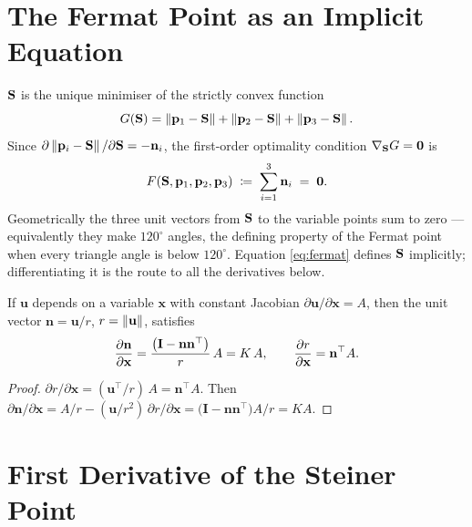 \documentclass[11pt,a4paper]{article}
\begin{document}
\section{The Fermat Point as an Implicit Equation}
\label{sec:implicit}

$\mathbf{S}$ is the unique minimiser of the strictly convex function
\begin{equation}
  G(\mathbf{S}) = \left\|\mathbf{p}_{1}-\mathbf{S}\right\| + \left\|\mathbf{p}_{2}-\mathbf{S}\right\| + \left\|\mathbf{p}_{3}-\mathbf{S}\right\|.
\end{equation}
Since $\partial\left\|\mathbf{p}_{i}-\mathbf{S}\right\|/\partial\mathbf{S} = -\mathbf{n}_i$, the first-order
optimality condition $\nabla_{\mathbf{S}} G = \mathbf{0}$ is
\begin{equation}
  F(\mathbf{S},\mathbf{p}_{1},\mathbf{p}_{2},\mathbf{p}_{3}) \;\coloneqq\; \sum_{i=1}^{3}\mathbf{n}_i
  \;=\; \mathbf{0}.
  \label{eq:fermat}
\end{equation}
Geometrically the three unit vectors from $\mathbf{S}$ to the variable points sum to
zero --- equivalently they make $120^\circ$ angles, the defining property of
the Fermat point when every triangle angle is below $120^\circ$.  Equation
\eqref{eq:fermat} defines $\mathbf{S}$ implicitly; differentiating it is the route to
all the derivatives below.

\begin{prop}
\label{prop:unit}
If $\mathbf{u}$ depends on a variable $\mathbf{x}$ with constant Jacobian
$\partial\mathbf{u}/\partial\mathbf{x} = A$, then the unit vector
$\mathbf{n}=\mathbf{u}/r$, $r=\left\|\mathbf{u}\right\|$, satisfies
\begin{equation}
  \dfrac{\partial \mathbf{n}}{\partial \mathbf{x}}
   = \frac{\bigl(\mathbf{I} - \mathbf{n} \mathbf{n}^\top\bigr)}{r}\,A
   = K\,A,
  \qquad
  \dfrac{\partial r}{\partial \mathbf{x}} = \mathbf{n}^\top A .
  \label{eq:unit-deriv}
\end{equation}
\end{prop}
\begin{proof}
$\partial r/\partial\mathbf{x} = (\mathbf{u}^\top/r)\,A = \mathbf{n}^\top A$.
Then $\partial\mathbf{n}/\partial\mathbf{x}
= A/r - (\mathbf{u}/r^2)\,\partial r/\partial\mathbf{x}
= \bigl(\mathbf{I}-\mathbf{n}\mathbf{n}^\top\bigr)A/r = K A$.
\end{proof}

\section{First Derivative of the Steiner Point}
\label{sec:first-S}
\end{document}
